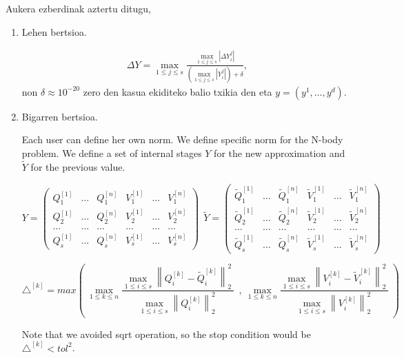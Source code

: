 Aukera ezberdinak aztertu ditugu,
\begin{enumerate}
\item Lehen bertsioa.

\begin{align*}
\Delta Y= \max_{1 \leqslant j \leqslant s} \frac{\max_{1 \leqslant j \leqslant s} |\Delta Y_i^j|}
                                                {(\max_{1 \leqslant j \leqslant s}|Y_i^j|)+\delta},
\end{align*}
non $\delta \approx 10^{-20}$ zero den kasua ekiditeko balio txikia den eta $y=(y^1,\dots,y^d)$.

\item Bigarren bertsioa.

Each user can define her own norm. We define specific norm for the N-body problem.
We define a set of internal stages $Y$ for the new approximation and $\tilde Y$ for the previous value.

\[Y=\left( \begin{array}{cccccc}
Q^{[1]}_1 & \dots  & Q^{[n]}_1 & V^{[1]}_1 & \dots  & V^{[n]}_1 \\ 
Q^{[1]}_2 & \dots  & Q^{[n]}_2 & V^{[1]}_2 & \dots  & V^{[n]}_2 \\ 
\dots  & \dots  & \dots  & \dots  & \dots  & \dots  \\ 
Q^{[1]}_s & \dots  & Q^{[n]}_s & V^{[1]}_s & \dots  & V^{[n]}_s \end{array}
\right)\ \  
\tilde Y=\left( \begin{array}{cccccc}
\tilde Q^{[1]}_1 & \dots  & \tilde Q^{[n]}_1 & \tilde V^{[1]}_1 & \dots  & \tilde V^{[n]}_1 \\ 
\tilde Q^{[1]}_2 & \dots  & \tilde Q^{[n]}_2 & \tilde V^{[1]}_2 & \dots  & \tilde V^{[n]}_2 \\ 
\dots  & \dots  & \dots  & \dots  & \dots  & \dots  \\ 
\tilde Q^{[1]}_s & \dots  & \tilde Q^{[n]}_s & \tilde V^{[1]}_s & \dots  & \tilde V^{[n]}_s \end{array}
\right)\] 

\begin{equation}
 \triangle^{[k]}=max\left({\  {{\max }_{1\le k\le n} \frac{{{\max }_{1\le i\le s} {\left\|Q^{[k]}_i-{\tilde{Q}}^{[k]}_i\right\|}^2_2\ }}{{{\max }_{1\le i\le s} {\left\|Q^{[k]}_i\right\|}^2_2\ }}\ }\ },\ {{\max }_{1\le k\le n} \frac{{{\max }_{1\le i\le s} {\left\|V^{[k]}_i-{\tilde{V}}^{[k]}_i\right\|}^2_2\ }}{{{\max }_{1\le i\le s} {\left\|V^{[k]}_i\right\|}^2_2\ }}\ }\right)
\end{equation}

Note that we avoided sqrt operation, so the stop condition would be $\triangle^{[k]} <tol^2$.


\end{enumerate} 


